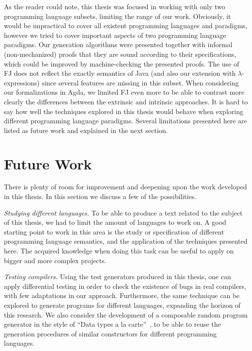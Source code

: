 \documentclass[tese,capa,english]{texufpel}
\begin{document}
As the reader could note, this thesis was focused in working with only two programming language subsets, limiting the range of our work. Obviously, it would be impractical to cover all existent programming languages and paradigms, however we tried to cover important aspects of two programming language paradigms. Our generation algorithms were presented together with informal (non-mechanized) proofs that they are sound according to their specifications, which could be improved by machine-checking the presented proofs. The use of FJ does not reflect the exactly semantics of Java (and also our extension with $\lambda$-expressions) since several features are missing in this subset. When considering our formalizations in Agda, we limited FJ even more to be able to contrast more clearly the differences between the extrinsic and intrinsic approaches. It is hard to say how well the techniques explored in this thesis would behave when exploring different programming language paradigms. Several limitations presented here are listed as future work and explained in the next section.

\section{Future Work}

There is plenty of room for improvement and deepening upon the work developed in this thesis. In this section we discuss a few of the possibilities.

\vspace{5pt}
\noindent\emph{Studying different languages. } To be able to produce a text related to the subject of this thesis, we had to limit the amount of languages to work on. A good starting point to work in this area is the study or specification of different programming language semantics, and the application of the techniques presented here. The acquired knowledge when doing this task can be useful to apply on bigger and more complex projects.

\vspace{8pt}
\noindent\emph{Testing compilers. } Using the test generators produced in this thesis, one can apply differential testing in order to check the existence of bugs in real compilers, with few adaptations in our approach. Furthermore, the same technique can be explored to generate programs for different languages, expanding the horizon of this research. We also consider the development of a composable random program generator in the style of ``Data types a la carte''~\cite{Swierstra:2008:DTL:1394794.1394795}, to be able to reuse the generation procedures of similar constructors for different programming languages.
\end{document}

